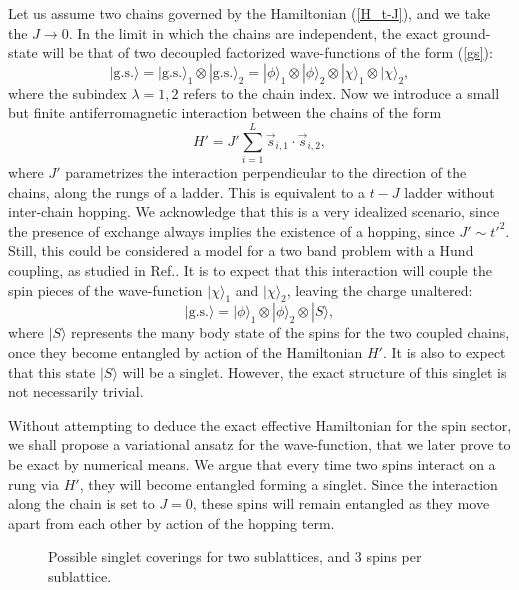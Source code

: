\documentclass[article,11pt]{revtex4}
\begin{document}
Let us assume two chains governed by the Hamiltonian (\ref{H_t-J}), and we take the $J \rightarrow 0$. In the limit in which the chains are independent, the exact ground-state will be that of two decoupled factorized wave-functions of the form (\ref{gs}):
\begin{equation}
|\mathrm{g.s.}\rangle=|\mathrm{g.s.}\rangle_1 \otimes |\mathrm{g.s.}\rangle_2=|\phi\rangle_1 \otimes |\phi\rangle_2 \otimes |\chi\rangle_1 \otimes |\chi\rangle_2,
\label{gs2}
\end{equation}
where the subindex $\lambda=1,2$ refers to the chain index.
Now we introduce a small but finite antiferromagnetic interaction between the chains of the form
\begin{equation}
H'=J'\sum_{i=1}^L  \vec{s}_{i,1} \cdot \vec{s}_{i,2},
\end{equation}
where $J'$ parametrizes the interaction perpendicular to the direction of the chains, along the rungs of a ladder. This is equivalent to a $t-J$ ladder without inter-chain hopping. We acknowledge that this is a very idealized scenario, since the presence of exchange always implies the existence of a hopping, since $J' \sim t'^2$. Still, this could be considered a model for a two band problem with a Hund coupling, as studied in Ref.\cite{Tsvelik}. It is to expect that this interaction will couple the spin pieces of the wave-function $|\chi\rangle_1$ and $|\chi\rangle_2$, leaving the charge unaltered:
\begin{equation}
|\mathrm{g.s.}\rangle=|\phi\rangle_1 \otimes |\phi\rangle_2 \otimes |S\rangle,
\label{gs3}
\end{equation}
where $|S\rangle$ represents the many body state of the spins for the two coupled chains, once they become entangled by action of the Hamiltonian $H'$.
It is also to expect that this state $|S\rangle$ will be a singlet. However, the exact structure of this singlet is not necessarily trivial. 

Without attempting to deduce the exact effective Hamiltonian for the spin sector, we shall propose a variational ansatz for the wave-function, that we later prove to be exact by numerical means. We argue that every time two spins interact on a rung via $H'$, they will become entangled forming a singlet. Since the interaction along the chain is set to $J=0$, these spins will remain entangled as they move apart from each other by action of the hopping term.

\begin{centering}
\begin{figure}
\caption{Possible singlet coverings for two sublattices, and 3 spins per sublattice.} 
\label{fig:VB1}
\end{figure}
\end{centering}
\end{document}
